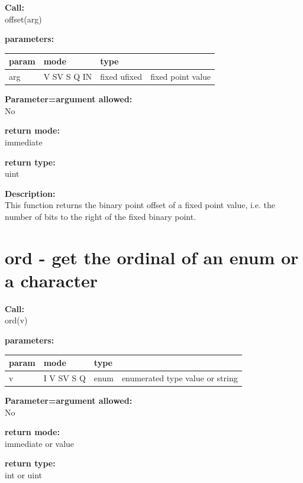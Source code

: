         {\bf Call:} \\
        offset(arg)
        
        {\bf parameters:} \\
        \begin{tabular}{| l | l | l | l |}
        \hline
        param  & mode & type & \\
        \hline \hline
        arg  & V SV S Q IN & fixed ufixed & fixed point value  \\ \hline
        \end{tabular}
        
        {\bf Parameter=argument allowed:} \\
        No
        
        {\bf return mode:} \\
        immediate

        {\bf return type:} \\
        uint
        
        {\bf Description:} \\
        This function returns the binary point offset of a fixed point value,
        i.e. the number of bits to the right of the fixed binary point.
 

    \section{ord - get the ordinal of an enum or a character}\label{sec:iford}
        
        {\bf Call:} \\
        ord(v)
        
        {\bf parameters:} \\
        \begin{tabular}{| l | l | l | l |}
        \hline
        param  & mode & type & \\
        \hline \hline
        v & I V SV S Q & enum & enumerated type value or string \\ \hline
        \end{tabular}
        
        {\bf Parameter=argument allowed:} \\
        No
        
        {\bf return mode:} \\
        immediate or value

        {\bf return type:} \\
        int or uint
        

